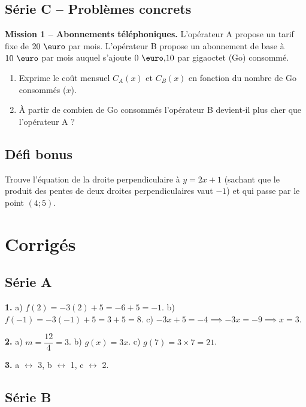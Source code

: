 \documentclass[../main.tex]{subfiles}
\begin{document}
\subsection{Série C -- Problèmes concrets}

\textbf{Mission 1 -- Abonnements téléphoniques.}
L'opérateur A propose un tarif fixe de $20\text{ \euro}$ par mois. L'opérateur B propose un abonnement de base à $10\text{ \euro}$ par mois auquel s'ajoute $0\text{ \euro}\dec 10$ par gigaoctet (Go) consommé.
\begin{enumerate}[label=\alph*)]
  \item Exprime le coût mensuel $C_A(x)$ et $C_B(x)$ en fonction du nombre de Go consommés ($x$).
  \item À partir de combien de Go consommés l'opérateur B devient-il plus cher que l'opérateur A ?
\end{enumerate}

\subsection{Défi bonus}
Trouve l'équation de la droite perpendiculaire à $y = 2x + 1$ (sachant que le produit des pentes de deux droites perpendiculaires vaut $-1$) et qui passe par le point $(4; 5)$.

\newpage
\section{Corrigés}

\subsection*{Série A}

\textbf{1.} a) $f(2) = -3(2) + 5 = -6 + 5 = -1$. \quad b) $f(-1) = -3(-1) + 5 = 3 + 5 = 8$. \quad c) $-3x + 5 = -4 \implies -3x = -9 \implies x = 3$.

\textbf{2.} a) $m = \dfrac{12}{4} = 3$. \quad b) $g(x) = 3x$. \quad c) $g(7) = 3 \times 7 = 21$.

\textbf{3.} a $\leftrightarrow$ 3, \quad b $\leftrightarrow$ 1, \quad c $\leftrightarrow$ 2.

\subsection*{Série B}
\end{document}
